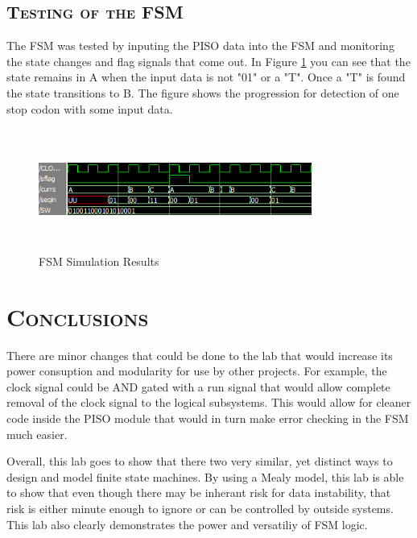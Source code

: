 \documentclass[11pt]{report}
\begin{document}
\begin{spacing}{1.5}
\clearpage

\subsection{\scshape Testing of the FSM}
\label{sub:test_counter}

The FSM was tested by inputing the PISO data into the FSM and monitoring the state changes and flag signals that come out.  In Figure \ref{fig:test_fsm} you can see that the state remains in A when the input data is not "01" or a "T".  Once a "T" is found the state transitions to B.  The figure shows the progression for detection of one stop codon with some input data.

\vspace{15px}
\begin{figure}[H]
    \centering
    \includegraphics[width=0.8\textwidth,height=4cm,keepaspectratio]{simulation.png}
    \caption{FSM Simulation Results}
    \label{fig:test_fsm}
\end{figure}

\section{\scshape Conclusions} %
\label{sec:conclusions}

There are minor changes that could be done to the lab that would increase its power consuption and modularity for use by other projects.  For example, the clock signal could be AND gated with a run signal that would allow complete removal of the clock signal to the logical subsystems.  This would allow for cleaner code inside the PISO module that would in turn make error checking in the FSM much easier.

Overall, this lab goes to show that there two very similar, yet distinct ways to design and model finite state machines.  By using a Mealy model, this lab is able to show that even though there may be inherant risk for data instability, that risk is either minute enough to ignore or can be controlled by outside systems.  This lab also clearly demonstrates the power and versatiliy of FSM logic.


\end{spacing}
\end{document}
